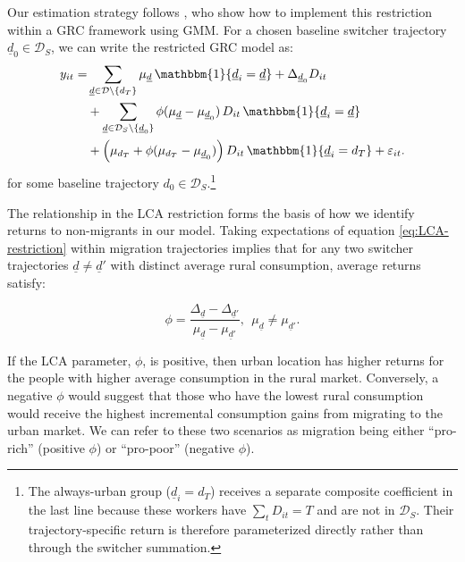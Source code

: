 \documentclass[12pt]{article}
\begin{document}
Our estimation strategy follows \cite{tjernstromCommentSuri2011}, who show how to implement this restriction within a GRC framework using GMM.
For a chosen baseline switcher trajectory $\underline d_0 \in \mathcal D_S$, we can write the restricted GRC model as:
\begin{align}
    y_{it} =& \sum_{\underline d \in \mathcal D \setminus \{d_T\}}
    \mu_{\underline d}\,\mathbbm{1}\{\underline d_i=\underline d\} + \Delta_{\underline d_0} D_{it} \nonumber \\
    & + \sum_{\underline d \in \mathcal D_S \setminus \{\underline d_0\}}
    \phi(\mu_{\underline d}-\mu_{\underline d_0})\,D_{it}\,\mathbbm{1}\{\underline d_i=\underline d\} \nonumber\\
    & + \Big(\mu_{d_T}+\phi(\mu_{d_T}-\mu_{\underline d_0})\Big)\,D_{it}\,\mathbbm{1}\{\underline d_i=d_T\} + \varepsilon_{it}.
    \label{eq:restricted-GRC}
\end{align} 
\noindent for some baseline trajectory $d_{0} \in \mathcal{D}_{S}$.\footnote{The always-urban group ($\underline d_i = d_T$) receives a separate composite coefficient in the last line because these workers have $\sum_t D_{it} = T$ and are not in $\mathcal D_S$.
Their trajectory-specific return is therefore parameterized directly rather than through the switcher summation.}

The relationship in the LCA restriction forms the basis of how we identify returns to non-migrants in our model.
Taking expectations of equation \eqref{eq:LCA-restriction} within migration trajectories implies that for any two switcher trajectories $\underline{d} \neq \underline{d}'$ with distinct average rural consumption, average returns satisfy:

\begin{equation}
    \phi = \frac{\Delta_{\underline{d}} - \Delta_{\underline{d}'}}{\mu_{\underline{d}} - \mu_{\underline{d}'}},\ \ \mu_{\underline{d}} \neq \mu_{\underline{d}'}.\label{eq:phi-proposition1}
\end{equation}

If the LCA parameter, $\phi$, is positive, then urban location has higher returns for the people with higher average consumption in the rural market.
Conversely, a negative $\phi$ would suggest that those who have the lowest rural consumption would receive the highest incremental consumption gains from migrating to the urban market.
We can refer to these two scenarios as migration being either ``pro-rich'' (positive $\phi$) or ``pro-poor'' (negative $\phi$).
 
\end{document}
